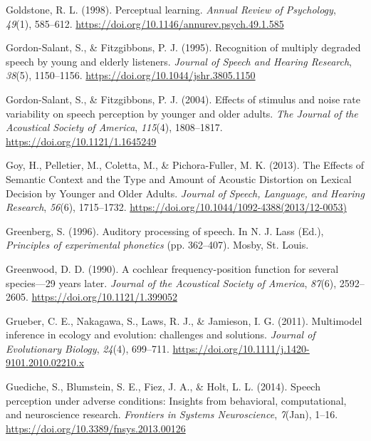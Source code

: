 \documentclass[a4paper, nobind]{templates/ociamthesis}
\newlength{\cslhangindent}
\newenvironment{CSLReferences}[2] %
 {%
  \setlength{\parindent}{0pt}
  \ifodd #1
  \let\oldpar\par
  \def\par{\hangindent=\cslhangindent\oldpar}
  \fi
  \setlength{\parskip}{1mm}
  \setlength{\baselineskip}{6mm}
 }%
 {}
\begin{document}
\begin{CSLReferences}{1}{0}
\leavevmode{}%
Goldstone, R. L. (1998). Perceptual learning. \emph{Annual Review of Psychology}, \emph{49}(1), 585--612. \url{https://doi.org/10.1146/annurev.psych.49.1.585}

\leavevmode{}%
Gordon-Salant, S., \& Fitzgibbons, P. J. (1995). {Recognition of multiply degraded speech by young and elderly listeners}. \emph{Journal of Speech and Hearing Research}, \emph{38}(5), 1150--1156. \url{https://doi.org/10.1044/jshr.3805.1150}

\leavevmode{}%
Gordon-Salant, S., \& Fitzgibbons, P. J. (2004). {Effects of stimulus and noise rate variability on speech perception by younger and older adults}. \emph{The Journal of the Acoustical Society of America}, \emph{115}(4), 1808--1817. \url{https://doi.org/10.1121/1.1645249}

\leavevmode{}%
Goy, H., Pelletier, M., Coletta, M., \& Pichora-Fuller, M. K. (2013). {The Effects of Semantic Context and the Type and Amount of Acoustic Distortion on Lexical Decision by Younger and Older Adults}. \emph{Journal of Speech, Language, and Hearing Research}, \emph{56}(6), 1715--1732. \url{https://doi.org/10.1044/1092-4388(2013/12-0053)}

\leavevmode{}%
Greenberg, S. (1996). Auditory processing of speech. In N. J. Lass (Ed.), \emph{Principles of experimental phonetics} (pp. 362--407). Mosby, St. Louis.

\leavevmode{}%
Greenwood, D. D. (1990). {A cochlear frequency-position function for several species---29 years later}. \emph{Journal of the Acoustical Society of America}, \emph{87}(6), 2592--2605. \url{https://doi.org/10.1121/1.399052}

\leavevmode{}%
Grueber, C. E., Nakagawa, S., Laws, R. J., \& Jamieson, I. G. (2011). Multimodel inference in ecology and evolution: challenges and solutions. \emph{Journal of Evolutionary Biology}, \emph{24}(4), 699--711. \url{https://doi.org/10.1111/j.1420-9101.2010.02210.x}

\leavevmode{}%
Guediche, S., Blumstein, S. E., Fiez, J. A., \& Holt, L. L. (2014). {Speech perception under adverse conditions: Insights from behavioral, computational, and neuroscience research}. \emph{Frontiers in Systems Neuroscience}, \emph{7}(Jan), 1--16. \url{https://doi.org/10.3389/fnsys.2013.00126}


\end{CSLReferences}
\end{document}
